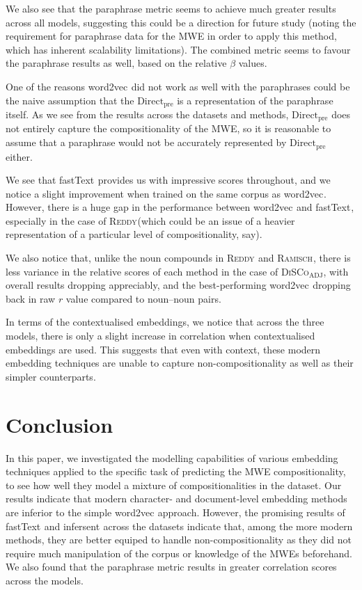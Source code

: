 \documentclass[11pt,a4paper]{article}
\newcommand{\embmethod}[2][]{\textsf{#2}$_{\text{#1}}$\xspace}
\newcommand{\wordtovec}{\embmethod{word2vec}}
\newcommand{\infersent}[1][]{\embmethod[#1]{infersent}}
\newcommand{\fasttext}{\embmethod{fastText}}
\newcommand{\dataset}[2][]{\textsc{#2}$_{\text{#1}}$\xspace}
\newcommand{\reddy}{\dataset{Reddy}}
\newcommand{\ramisch}{\dataset{Ramisch}}
\newcommand{\discoj}[1][]{\dataset[#1]{DiSCo}}
\newcommand{\method}[2][]{\ensuremath{\text{#2}_{\text{#1}}}\xspace}
\newcommand{\presum}{\method[pre]{Direct}}
\begin{document}
We also see that the paraphrase metric seems to achieve much greater results across all models, suggesting this could be a direction for future study (noting the requirement for paraphrase data for the MWE in order to apply this method, which has inherent scalability limitations). The combined metric seems to favour the paraphrase results as well, based on the relative $\beta$ values.

One of the reasons \wordtovec did not work as well with the paraphrases could be the naive assumption that the \presum is a representation of the paraphrase itself. As we see from the results across the datasets and methods, \presum does not entirely capture the compositionality of the MWE, so it is reasonable to assume that a paraphrase would not be accurately represented by  \presum either. 

We see that \fasttext provides us with impressive scores throughout, and we notice a slight improvement when trained on the same corpus as \wordtovec. However, there is a huge gap in the performance between \wordtovec and \fasttext, especially in the case of \reddy (which could be an issue of a heavier representation of a particular level of compositionality, say).

We also notice that, unlike the noun compounds in \reddy and \ramisch, there is less variance in the relative scores of each method in the case of \discoj[ADJ], with overall results dropping appreciably, and the best-performing \wordtovec dropping back in raw $r$ value compared to noun--noun pairs.

In terms of the contextualised embeddings, we notice that across the three models, there is only a slight increase in correlation when contextualised embeddings are used. This suggests that even with context, these modern embedding techniques are unable to capture non-compositionality as well as their simpler counterparts.

\section{Conclusion}
\label{sec:length}

In this paper, we investigated the modelling capabilities of various embedding techniques applied to the specific task of predicting the MWE compositionality, to see how well they model a mixture of compositionalities in the dataset. Our results indicate that modern character- and document-level embedding methods are inferior to the simple \wordtovec approach. However, the promising results of \fasttext and \infersent across the datasets indicate that, among the more modern methods, they are better equiped to handle non-compositionality as they did not require much manipulation of the corpus or knowledge of the MWEs beforehand. We also found that the paraphrase metric results in greater correlation scores across the models.
\end{document}
